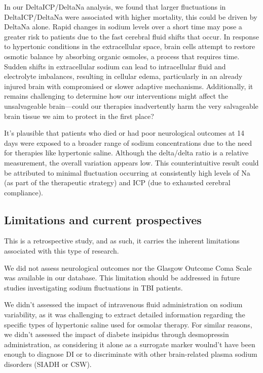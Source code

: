 In our DeltaICP/DeltaNa analysis, we found that larger fluctuations in DeltaICP/DeltaNa were associated with higher mortality, this could be driven by DeltaNa alone. Rapid changes in sodium levels over a short time may pose a greater risk to patients due to the fast cerebral fluid shifts that occur. In response to hypertonic conditions in the extracellular space, brain cells attempt to restore osmotic balance by absorbing organic osmoles, a process that requires time. Sudden shifts in extracellular sodium can lead to intracellular fluid and electrolyte imbalances, resulting in cellular edema, particularly in an already injured brain with compromised or slower adaptive mechanisms. Additionally, it remains challenging to determine how our interventions might affect the unsalvageable brain—could our therapies inadvertently harm the very salvageable brain tissue we aim to protect in the first place?

It’s plausible that patients who died or had poor neurological outcomes at 14 days were exposed to a broader range of sodium concentrations due to the need for therapies like hypertonic saline. Although the delta/delta ratio is a relative measurement, the overall variation appears low. This counterintuitive result could be attributed to minimal fluctuation occurring at consistently high levels of Na (as part of the therapeutic strategy) and ICP (due to exhausted cerebral compliance).

\subsection{Limitations and current prospectives}
This is a retrospective study, and as such, it carries the inherent limitations associated with this type of research.

We did not assess neurological outcomes nor the Glasgow Outcome Coma Scale was available in our database. This limitation should be addressed in future studies investigating sodium fluctuations in TBI patients.

We didn't assessed the impact of intravenous fluid administration on sodium variability, as it was challenging to extract detailed information regarding the specific types of hypertonic saline\cite{holdenHypertonicSalineUse2023a} used for osmolar therapy.
For similar reasons, we didn't assessed the impact of diabete insipidus through desmopressin administration, as considering it alone as a surrogate marker woulnd't have been enough to diagnose DI or to discriminate with other brain-related plasma sodium disorders (SIADH or CSW). 

